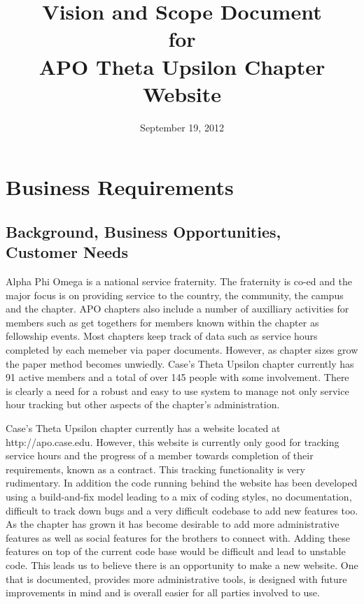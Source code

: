\documentclass[11pt,letterpaper,rotate]{article}
\title{Vision and Scope Document \\
for \\
APO Theta Upsilon Chapter Website}
\date{September 19, 2012}
\begin{document}
\maketitle
\newpage

\tableofcontents
\listoffigures

\newpage

\section{Business Requirements}


\subsection{Background, Business Opportunities, Customer Needs}


Alpha Phi Omega is a national service fraternity. The fraternity is co-ed and the major focus is on providing service to the country, the community, the campus and the chapter. APO chapters also include a number of auxilliary activities for members such as get togethers for members known within the chapter as fellowship events. Most chapters keep track of data such as service hours completed by each memeber via paper documents. However, as chapter sizes grow the paper method becomes unwiedly. Case's Theta Upsilon chapter currently has 91 active members and a total of over 145 people with some involvement. There is clearly a need for a robust and easy to use system to manage not only service hour tracking but other aspects of the chapter's administration.

Case's Theta Upsilon chapter currently has a website located at http://apo.case.edu. However, this website is currently only good for tracking service hours and the progress of a member towards completion of their requirements, known as a contract. This tracking functionality is very rudimentary. In addition the code running behind the website has been developed using a build-and-fix model leading to a mix of coding styles, no documentation, difficult to track down bugs and a very difficult codebase to add new features too. As the chapter has grown it has become desirable to add more administrative features as well as social features for the brothers to connect with. Adding these features on top of the current code base would be difficult and lead to unstable code. This leads us to believe there is an opportunity to make a new website. One that is documented, provides more administrative tools, is designed with future improvements in mind and is overall easier for all parties involved to use.
\end{document}
